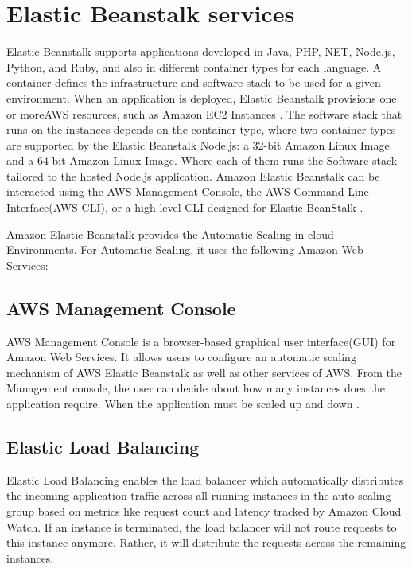 \documentclass[9pt,twocolumn,twoside]{../../styles/osajnl}
\begin{document}
\section{Elastic Beanstalk services}

Elastic Beanstalk supports applications developed in Java, PHP, NET,
Node.js, Python, and Ruby, and also in different container types for
each language. A container defines the infrastructure and software
stack to be used for a given environment. When an application is
deployed, Elastic Beanstalk provisions one or moreAWS resources, such
as Amazon EC2 Instances \cite{elastic-beanstalk-book}. The software
stack that runs on the instances depends on the container type, where
two container types are supported by the Elastic Beanstalk Node.js: a
32-bit Amazon Linux Image and a 64-bit Amazon Linux Image. Where each
of them runs the Software stack tailored to the hosted Node.js
application. Amazon Elastic Beanstalk can be interacted using the AWS
Management Console, the AWS Command Line Interface(AWS CLI), or a
high-level CLI designed for Elastic BeanStalk
\cite{elastic-beanstalk-book}.

Amazon Elastic Beanstalk provides the Automatic Scaling in cloud
Environments.  For Automatic Scaling, it uses the following Amazon Web
Services:

\subsection{AWS Management Console}

AWS Management Console is a browser-based graphical user
interface(GUI) for Amazon Web Services. It allows users to configure
an automatic scaling mechanism of AWS Elastic Beanstalk as well as
other services of AWS. From the Management console, the user can decide
about how many instances does the application require. When the
application must be scaled up and down \cite{elastic-beanstalk}.

\subsection{Elastic Load Balancing}

Elastic Load Balancing enables the load balancer which automatically
distributes the incoming application traffic across all running
instances in the auto-scaling group based on metrics like request count
and latency tracked by Amazon Cloud Watch. If an instance is
terminated, the load balancer will not route requests to this instance
anymore. Rather, it will distribute the requests across the remaining
instances.
    
\end{document}
